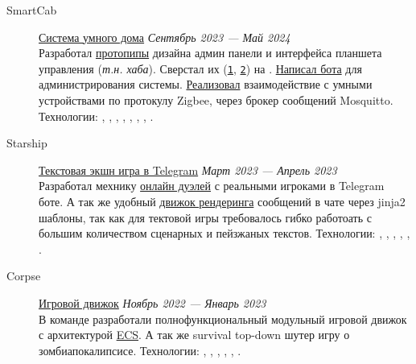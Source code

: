 \documentclass[margin,line]{resume}
\begin{document}
\begin{resume}
\begin{description}
  \item[SmartCab]\small{\href{https://github.com/smart-cab}{Система
      умного дома} \hfill
    \textsl{Сентябрь 2023 — Май 2024\vspace{1mm}}}\\
    Разработал
    \href{https://www.figma.com/design/8H1tFpxgmIDV1xp06ndi73/SmartCab?node-id=0-1&p=f}{протопипы}
    дизайна админ панели и интерфейса планшета управления
    (\textit{т.н. хаба}). Сверстал их
    (\texttt{\href{https://github.com/smart-cab/smartcab-hub/tree/main/frontend/src}{1}},
    \texttt{\href{https://github.com/smart-cab/smartcab-dashboard/tree/main/frontend/src}{2}})
    на .
    \href{https://github.com/smart-cab/smartcab-bot}{Написал бота}
    для администрирования системы.
    \href{https://github.com/smart-cab/smartcab-hub/blob/main/backend/smartcab/interface/mqtt.py}{Реализовал}
    взаимодействие с умными устройствами по протокулу Zigbee, через
    брокер сообщений Mosquitto.
    Технологии:
    , ,
    , ,
    ,
    , ,
    .
    \vspace{3mm}

  \item[Starship]\small{\href{https://github.com/starship-crew}{Текстовая
      экшн игра в Telegram}
    \hfill \textsl{Март 2023 — Апрель 2023\vspace{1mm}}}\\
    Разработал мехнику
    \href{https://github.com/starship-crew/telegram-client/blob/main/app/handlers/fight.py}{онлайн
    дуэлей} с реальными игроками в Telegram боте. А
    так же удобный
    \href{https://github.com/starship-crew/telegram-client/blob/main/app/template.py}{движок
    рендеринга}
    сообщений в чате через jinja2 шаблоны, так как для тектовой игры
    требовалось гибко работоать с большим количеством сценарных и
    пейзжаных текстов.
    Технологии:
    , ,
    ,
    , ,
    .

    \vspace{3mm}

  \item[Corpse]\small{\href{https://github.com/corpse-inc/corpse}{Игровой
      движок}
    \hfill \textsl{Ноябрь 2022 — Январь 2023\vspace{1mm}}}\\
    В команде разработали полнофункциональный модульный
    игровой движок с архитектурой
    \href{https://en.wikipedia.org/wiki/Entity_component_system#:~:text=Entity%E2%80%93component%E2%80%93system%20(ECS,Entity%E2%80%93Component%E2%80%93System%20layout.}{ECS}.
      А так же survival top-down шутер игру о зомбиапокалипсисе.
      Технологии:
      , ,
      , , ,
      .


\end{description}
\end{resume}
\end{document}
